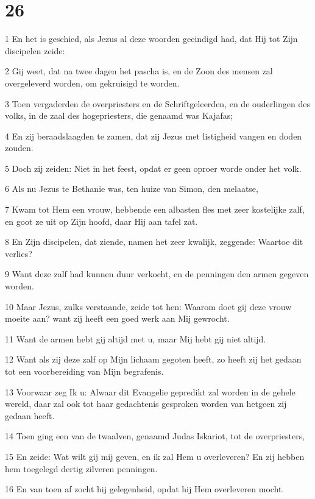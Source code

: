 \chapter{26}

\par 1 En het is geschied, als Jezus al deze woorden geeindigd had, dat Hij tot Zijn discipelen zeide:
\par 2 Gij weet, dat na twee dagen het pascha is, en de Zoon des mensen zal overgeleverd worden, om gekruisigd te worden.
\par 3 Toen vergaderden de overpriesters en de Schriftgeleerden, en de ouderlingen des volks, in de zaal des hogepriesters, die genaamd was Kajafas;
\par 4 En zij beraadslaagden te zamen, dat zij Jezus met listigheid vangen en doden zouden.
\par 5 Doch zij zeiden: Niet in het feest, opdat er geen oproer worde onder het volk.
\par 6 Als nu Jezus te Bethanie was, ten huize van Simon, den melaatse,
\par 7 Kwam tot Hem een vrouw, hebbende een albasten fles met zeer kostelijke zalf, en goot ze uit op Zijn hoofd, daar Hij aan tafel zat.
\par 8 En Zijn discipelen, dat ziende, namen het zeer kwalijk, zeggende: Waartoe dit verlies?
\par 9 Want deze zalf had kunnen duur verkocht, en de penningen den armen gegeven worden.
\par 10 Maar Jezus, zulks verstaande, zeide tot hen: Waarom doet gij deze vrouw moeite aan? want zij heeft een goed werk aan Mij gewrocht.
\par 11 Want de armen hebt gij altijd met u, maar Mij hebt gij niet altijd.
\par 12 Want als zij deze zalf op Mijn lichaam gegoten heeft, zo heeft zij het gedaan tot een voorbereiding van Mijn begrafenis.
\par 13 Voorwaar zeg Ik u: Alwaar dit Evangelie gepredikt zal worden in de gehele wereld, daar zal ook tot haar gedachtenis gesproken worden van hetgeen zij gedaan heeft.
\par 14 Toen ging een van de twaalven, genaamd Judas Iskariot, tot de overpriesters,
\par 15 En zeide: Wat wilt gij mij geven, en ik zal Hem u overleveren? En zij hebben hem toegelegd dertig zilveren penningen.
\par 16 En van toen af zocht hij gelegenheid, opdat hij Hem overleveren mocht.
